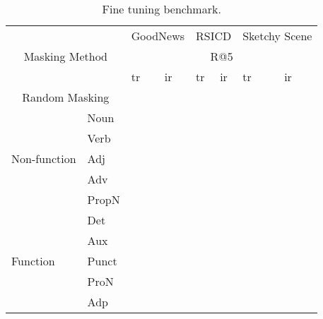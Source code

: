 \begin{table}[]
    \centering
    \label{tab:flickr30k}
    \caption{Fine tuning benchmark.}
    \begin{tabular}{ll|llllll}
        \multicolumn{2}{c|}{\multirow{3}{*}{Masking Method}} & \multicolumn{2}{c}{GoodNews} & \multicolumn{2}{c}{RSICD} & \multicolumn{2}{c}{Sketchy Scene} \\
        \multicolumn{2}{l|}{} & \multicolumn{6}{c}{R@5} \\
        \multicolumn{2}{l|}{} & \acrshort{tr} & \acrshort{ir}  & \acrshort{tr} & \acrshort{ir}  & \acrshort{tr} & \acrshort{ir} \\
        \hline
        \multicolumn{2}{c|}{Random Masking} & & & & \\
        \hline
        \multirow{5}{*}{Non-function} & Noun & & & & \\
        & Verb & & & & \\
        & Adj & & & & \\
        & Adv & & & & \\
        & PropN & & & & \\
        \hline
        \multirow{5}{*}{Function} & Det & & & & \\
        & Aux & & & & \\
        & Punct & & & & \\
        & ProN & & & & \\
        & Adp & & & & \\
    \end{tabular}
\end{table}